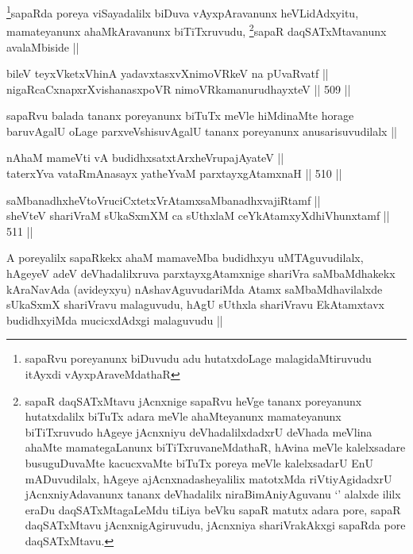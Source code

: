 \begin{artha}
\footnote{sapaRvu poreyanunx biDuvudu adu hutatxdoLage
  malagidaMtiruvudu itAyxdi vAyxpAraveMdathaR}sapaRda poreya viSayadalilx biDuva vAyxpAravanunx
heVLidAdxyitu, mamateyanunx ahaMkAravanunx
biTiTxruvudu, \footnote{sapaR daqSATxMtavu jAcnxnige sapaRvu heVge
  tananx poreyanunx hutatxdalilx biTuTx adara meVle ahaMteyanunx
  mamateyanunx biTiTxruvudo hAgeye jAcnxniyu deVhadalilxdadxrU deVhada
  meVlina ahaMte mamategaLanunx biTiTxruvaneMdathaR, hAvina meVle
  kalelxsadare busuguDuvaMte kacucxvaMte biTuTx poreya meVle
  kalelxsadarU EnU mADuvudilalx, hAgeye ajAcnxnadasheyalilix matotxMda
  riVtiyAgidadxrU jAcnxniyAdavanunx tananx deVhadalilx
  niraBimAniyAguvanu `\stext' alalxde ililx eraDu daqSATxMtagaLeMdu
  tiLiya beVku sapaR matutx adara pore, sapaR daqSATxMtavu
  jAcnxnigAgiruvudu,  jAcnxniya shariVrakAkxgi sapaRda pore daqSATxMtavu.}sapaR daqSATxMtavanunx avalaMbiside ||
\end{artha}

\begin{shl}
bileV teyxVketxV\s hinA yadavxtasxvXnimoVRkeV na pUvaRvatf || \\
nigaRcaCxnapxrXvishanasxpoVR nimoVRkamanurudhayxteV ||  509 ||  
\end{shl}

\begin{artha}
sapaRvu balada tananx poreyanunx biTuTx meVle hiMdinaMte horage
baruvAgalU oLage parxveVshisuvAgalU tananx poreyanunx
anusarisuvudilalx ||
\end{artha}


\begin{shl}
nAhaM mameVti vA budidhxsatxtArxheVrupajAyateV || \\
taterxYva vataRmAnasayx yatheYvaM parxtayxgAtamxnaH ||  510 ||  
\end{shl}

\begin{shl}
saMbanadhxheVtoVruciCxtetxVrAtamxsaMbanadhxvajiRtamf || \\
sheVteV shariVraM sUkaSxmXM ca sUthxlaM ceYkAtamxyXdhiVhunxtamf ||  511 ||  
\end{shl}

\begin{artha}
A poreyalilx sapaRkekx ahaM mamaveMba budidhxyu uMTAguvudilalx,
hAgeyeV adeV deVhadalilxruva parxtayxgAtamxnige shariVra saMbaMdhakekx
kAraNavAda (avideyxyu) nAshavAguvudariMda Atamx saMbaMdhavilalxde
sUkaSxmX shariVravu malaguvudu, hAgU sUthxla shariVravu EkAtamxtavx
budidhxyiMda mucicxdAdxgi malaguvudu ||
\end{artha}

